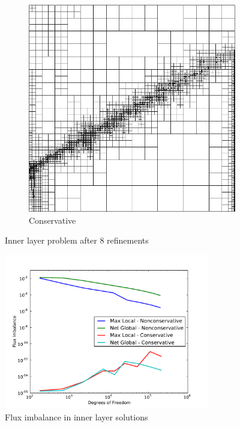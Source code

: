 \documentclass[letterpaper]{article}
\begin{document}
\begin{figure}[p]
\begin{subfigure}[t]{0.45\textwidth}
\includegraphics[width=\textwidth]{figs/InnerLayer/modified8c_mesh.png}
\caption{Conservative}
\label{fig:innerlayer8c}
\end{subfigure}
\caption{Inner layer problem after 8 refinements}
\label{fig:innerlayer}
\end{figure}

\begin{figure}[h!]
\centering
\includegraphics[width=0.8\textwidth]{figs/InnerLayer/modifiedFlux.pdf}
\caption{Flux imbalance in inner layer solutions}
\label{fig:innerlayer_flux}
\end{figure}
\end{document}

